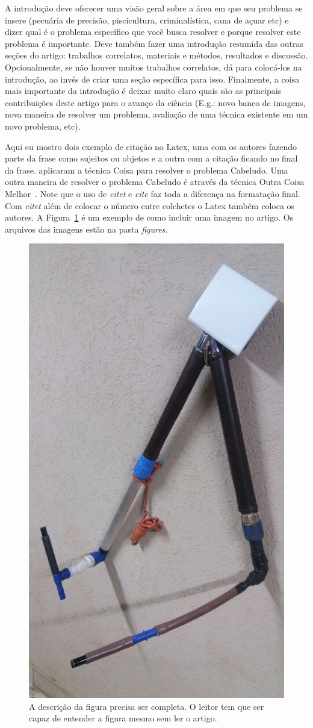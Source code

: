 \documentclass[preprint,10pt,5p]{elsarticle}
\begin{document}
A introdução deve oferecer uma visão geral sobre a área em que seu problema se insere (pecuária de precisão, piscicultura, criminalística, cana de açuar etc) e dizer qual é o problema específico que você busca resolver e porque resolver este problema é importante. Deve também fazer uma introdução resumida das outras seções do artigo: trabalhos correlatos, materiais e métodos, resultados e discussão. Opcionalmente, se não houver muitos trabalhos correlatos, dá para colocá-los na introdução, ao invés de criar uma seção específica para isso. Finalmente, a coisa mais importante da introdução é deixar muito claro quais são as principais contribuições deste artigo para o avanço da ciência (E.g.: novo banco de imagens, nova maneira de resolver um problema, avaliação de uma técnica existente em um novo problema, etc).
    
Aqui eu mostro dois exemplo de citação no Latex, uma com os autores fazendo parte da frase como sujeitos ou objetos e a outra com a citação ficando no final da frase. \citet{tola2010daisy} aplicaram a técnica Coisa para resolver o problema Cabeludo. Uma outra maneira de resolver o problema Cabeludo é através da técnica Outra Coisa Melhor~\cite{bouvier2008}. Note que o uso de \textit{citet} e \textit{cite} faz toda a diferença na formatação final. Com \textit{citet} além de colocar o número entre colchetes o Latex também coloca os autores.  A Figura~\ref{fig:rumicam} é um exemplo de como incluir uma imagem no artigo. Os arquivos das imagens estão na pasta \textit{figures}. 


\begin{figure}
  \centering
  \includegraphics[width=0.4\linewidth]{figures/rumicam.jpg} 

   \caption{A descrição da figura precisa ser completa. O leitor tem que ser capaz de entender a figura mesmo sem ler o artigo.}
   \label{fig:rumicam}
\end{figure}
 
\end{document}
